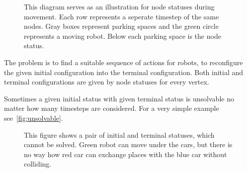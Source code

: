 \begin{figure}[h]
    \begin{center}
        
        \caption{This diagram serves as an illustration for node statuses
            during movement. Each row represents a seperate timestep of the
            same nodes. Gray boxes represent parking spaces and the green
            circle represents a moving robot. Below each parking space is the node
        status.}
        \label{fig:movingstatus}
    \end{center}
\end{figure}

The problem is to find a suitable sequence of actions for robots, to
reconfigure the given initial configuration into the terminal configuration.
Both initial and terminal configurations are given by node statuses for every
vertex.

Sometimes a given initial status with given terminal status is unsolvable no
matter how many timesteps are considered. For a very simple example
see~\autoref{fig:unsolvable}.

\begin{figure}[h]
    \begin{center}
        
        \caption{This figure shows a pair of initial and terminal statuses,
            which cannot be solved. Green robot can move under the cars, but there
            is no way how red car can exchange places with the blue car without
        colliding.}
        \label{fig:unsolvable}
    \end{center}
\end{figure}
